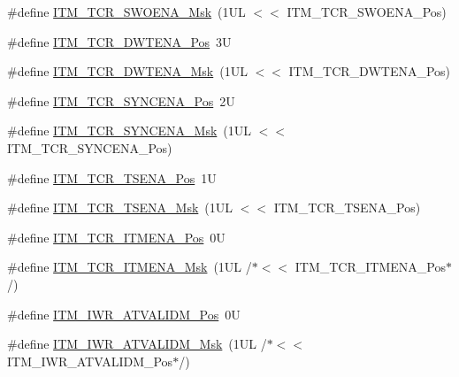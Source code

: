 \begin{DoxyCompactItemize}
\item 
\#define \hyperlink{group___c_m_s_i_s___i_t_m_ga97476cb65bab16a328b35f81fd02010a}{I\+T\+M\+\_\+\+T\+C\+R\+\_\+\+S\+W\+O\+E\+N\+A\+\_\+\+Msk}~(1\+U\+L $<$$<$ I\+T\+M\+\_\+\+T\+C\+R\+\_\+\+S\+W\+O\+E\+N\+A\+\_\+\+Pos)
\item 
\#define \hyperlink{group___c_m_s_i_s___i_t_m_ga30e83ebb33aa766070fe3d1f27ae820e}{I\+T\+M\+\_\+\+T\+C\+R\+\_\+\+D\+W\+T\+E\+N\+A\+\_\+\+Pos}~3U
\item 
\#define \hyperlink{group___c_m_s_i_s___i_t_m_ga98ea1c596d43d3633a202f9ee746cf70}{I\+T\+M\+\_\+\+T\+C\+R\+\_\+\+D\+W\+T\+E\+N\+A\+\_\+\+Msk}~(1\+U\+L $<$$<$ I\+T\+M\+\_\+\+T\+C\+R\+\_\+\+D\+W\+T\+E\+N\+A\+\_\+\+Pos)
\item 
\#define \hyperlink{group___c_m_s_i_s___i_t_m_gaa93a1147a39fc63980d299231252a30e}{I\+T\+M\+\_\+\+T\+C\+R\+\_\+\+S\+Y\+N\+C\+E\+N\+A\+\_\+\+Pos}~2U
\item 
\#define \hyperlink{group___c_m_s_i_s___i_t_m_gac89b74a78701c25b442105d7fe2bbefb}{I\+T\+M\+\_\+\+T\+C\+R\+\_\+\+S\+Y\+N\+C\+E\+N\+A\+\_\+\+Msk}~(1\+U\+L $<$$<$ I\+T\+M\+\_\+\+T\+C\+R\+\_\+\+S\+Y\+N\+C\+E\+N\+A\+\_\+\+Pos)
\item 
\#define \hyperlink{group___c_m_s_i_s___i_t_m_ga5aa381845f810114ab519b90753922a1}{I\+T\+M\+\_\+\+T\+C\+R\+\_\+\+T\+S\+E\+N\+A\+\_\+\+Pos}~1U
\item 
\#define \hyperlink{group___c_m_s_i_s___i_t_m_ga436b2e8fa24328f48f2da31c00fc9e65}{I\+T\+M\+\_\+\+T\+C\+R\+\_\+\+T\+S\+E\+N\+A\+\_\+\+Msk}~(1\+U\+L $<$$<$ I\+T\+M\+\_\+\+T\+C\+R\+\_\+\+T\+S\+E\+N\+A\+\_\+\+Pos)
\item 
\#define \hyperlink{group___c_m_s_i_s___i_t_m_ga3286b86004bce7ffe17ee269f87f8d9d}{I\+T\+M\+\_\+\+T\+C\+R\+\_\+\+I\+T\+M\+E\+N\+A\+\_\+\+Pos}~0U
\item 
\#define \hyperlink{group___c_m_s_i_s___i_t_m_ga7dd53e3bff24ac09d94e61cb595cb2d9}{I\+T\+M\+\_\+\+T\+C\+R\+\_\+\+I\+T\+M\+E\+N\+A\+\_\+\+Msk}~(1\+U\+L /$\ast$$<$$<$ I\+T\+M\+\_\+\+T\+C\+R\+\_\+\+I\+T\+M\+E\+N\+A\+\_\+\+Pos$\ast$/)
\item 
\#define \hyperlink{group___c_m_s_i_s___i_t_m_ga04d3f842ad48f6a9127b4cecc963e1d7}{I\+T\+M\+\_\+\+I\+W\+R\+\_\+\+A\+T\+V\+A\+L\+I\+D\+M\+\_\+\+Pos}~0U
\item 
\#define \hyperlink{group___c_m_s_i_s___i_t_m_ga67b969f8f04ed15886727788f0e2ffd7}{I\+T\+M\+\_\+\+I\+W\+R\+\_\+\+A\+T\+V\+A\+L\+I\+D\+M\+\_\+\+Msk}~(1\+U\+L /$\ast$$<$$<$ I\+T\+M\+\_\+\+I\+W\+R\+\_\+\+A\+T\+V\+A\+L\+I\+D\+M\+\_\+\+Pos$\ast$/)
\item 

\end{DoxyCompactItemize}
